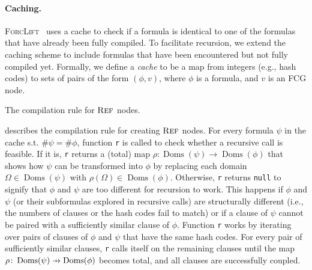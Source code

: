 \documentclass{article}
\theoremstyle{definition}
\newcommand\pfun{\mathrel{\ooalign{\hfil$\mapstochar\mkern5mu$\hfil\cr$\to$\cr}}}
\DeclareMathOperator{\Reff}{\textsc{Ref}}
\DeclareMathOperator{\Doms}{Doms}
\begin{document}
\paragraph{Caching.}
\textsc{ForcLift}~\cite{DBLP:conf/ijcai/BroeckTMDR11} uses a cache to check if
a formula is identical to one of the formulas that have already been fully
compiled. To facilitate recursion, we extend the caching scheme to include
formulas that have been encountered but not fully compiled yet. Formally, we
define a \emph{cache} to be a map from integers (e.g., hash codes) to sets of
pairs of the form $(\phi, v)$, where $\phi$ is a formula, and $v$ is an FCG
node.

\begin{algorithm}[t]
  \caption{The compilation rule for $\Reff$ nodes.}\label{alg:trycache}

  \ForEach{formula and node $(\psi, v) \in C(\#\phi)$}{\label{line:selectformula}
    $\rho \gets \identifyRecursion{$\phi$, $\psi$}$\;
    \lIf{$\rho \ne {\normalfont \texttt{null}}$}{\Return{$\{\, (\Reff_\rho(v), \langle\rangle) \,\}$}}\label{line:rho}
  }
  \Return{$\emptyset$}\;

\end{algorithm}

 describes the compilation rule for creating $\Reff$ nodes.
For every formula $\psi$ in the cache s.t. $\#\psi = \#\phi$, function
\texttt{r} is called to check whether a recursive call is feasible. If it is,
\texttt{r} returns a (total) map $\rho\colon \Doms(\psi) \to \Doms(\phi)$ that
shows how $\psi$ can be transformed into $\phi$ by replacing each domain
$\Omega \in \Doms(\psi)$ with $\rho(\Omega) \in \Doms(\phi)$. Otherwise,
\texttt{r} returns \texttt{null} to signify that $\phi$ and $\psi$ are too
different for recursion to work. This happens if $\phi$ and $\psi$ (or their
subformulas explored in recursive calls) are structurally different (i.e., the
numbers of clauses or the hash codes fail to match) or if a clause of $\psi$
cannot be paired with a sufficiently similar clause of $\phi$. Function
\texttt{r} works by iterating over pairs of clauses of $\phi$ and $\psi$ that
have the same hash codes. For every pair of sufficiently similar clauses,
\texttt{r} calls itself on the remaining clauses until the map
$\rho\colon \Doms(\psi) \pfun \Doms(\phi)$ becomes total, and all clauses are
successfully coupled.
\end{document}
